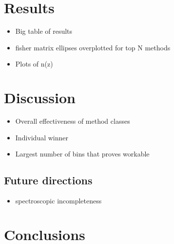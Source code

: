 \documentclass[twocolumn,twocolappendix]{aastex63}
\begin{document}
\section{Results}
\begin{itemize}
    \item Big table of results
    \item fisher matrix ellipses overplotted for top N methods
    \item Plots of n(z)
\end{itemize}

\section{Discussion}
\begin{itemize}
    \item Overall effectiveness of method classes
    \item Individual winner
    \item Largest number of bins that proves workable
\end{itemize}

\subsection{Future directions}

\begin{itemize}
    \item spectroscopic incompleteness
\end{itemize}

\section{Conclusions}



\end{document}

